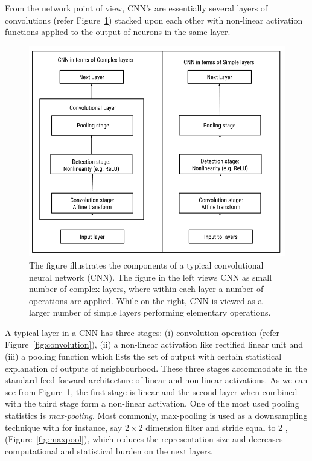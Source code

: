 From the network point of view, CNN's are essentially several layers of convolutions (refer Figure~\ref{fig:CNN_layer}) stacked upon each other with non-linear activation functions applied to the output of neurons in the same layer. 
\begin{figure}[!htb]
    \centering
    \includegraphics[scale=0.5]{Figures/cnn.png}
    \caption{The figure illustrates the components of a typical convolutional neural network (CNN). The figure in the left views CNN as small number of complex layers, where within each layer a number of operations are applied. While on the right, CNN is viewed as a larger number of simple layers performing elementary operations.}
    \label{fig:CNN_layer}
\end{figure}
A typical layer in a CNN has three stages: (i) convolution operation (refer Figure~\ref{fig:convolution}), (ii) a non-linear activation like rectified linear unit and (iii) a pooling function which lists the set of output with certain statistical explanation of outputs of neighbourhood. These three stages accommodate in the standard feed-forward architecture of linear and non-linear activations. As we can see from Figure~\ref{fig:CNN_layer},
the first stage is linear and the second layer when combined with the third stage form a non-linear activation. 
One of the most used pooling statistics is \emph{max-pooling}. Most commonly, max-pooling is used as a downsampling technique with for instance, say $2 \times 2$ dimension filter and stride equal to 2 , (Figure~\ref{fig:maxpool}), which reduces the representation size and decreases computational and statistical burden on the next layers.



